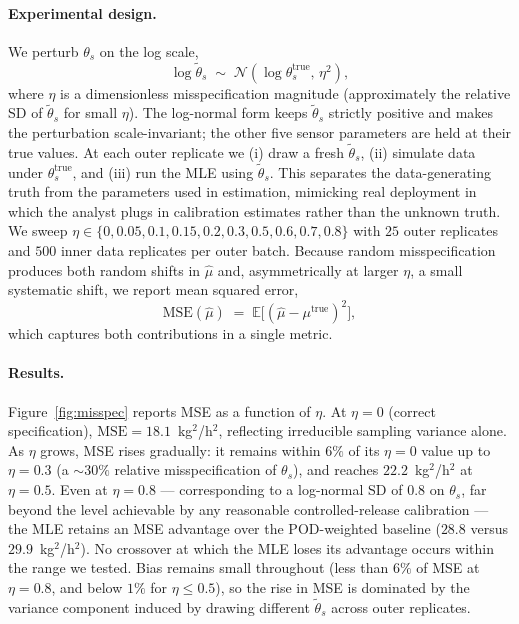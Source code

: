 \documentclass[11pt]{article}
\newcommand{\new}[1]{{\color{blue}#1}}
\begin{document}
\paragraph{Experimental design.}
\new{We perturb $\theta_s$ on the log scale,
\begin{equation}
    \log \tilde\theta_s \;\sim\; \mathcal{N}(\log \theta_s^{\text{true}},\, \eta^2),
\end{equation}
where $\eta$ is a dimensionless misspecification magnitude
(approximately the relative SD of $\tilde\theta_s$ for small $\eta$). The
log-normal form keeps $\tilde\theta_s$ strictly positive and makes the
perturbation scale-invariant; the other five sensor parameters are held
at their true values. At each outer replicate we (i) draw a fresh
$\tilde\theta_s$, (ii) simulate data under $\theta_s^{\text{true}}$, and
(iii) run the MLE using $\tilde\theta_s$. This separates the data-generating
truth from the parameters used in estimation, mimicking real deployment in
which the analyst plugs in calibration estimates rather than the unknown
truth. We sweep $\eta \in \{0, 0.05, 0.1, 0.15, 0.2, 0.3, 0.5, 0.6, 0.7, 0.8\}$
with $25$ outer replicates and $500$ inner data replicates per outer
batch. Because random misspecification produces both random shifts in
$\hat\mu$ and, asymmetrically at larger $\eta$, a small systematic shift,
we report mean squared error,
\begin{equation}
    \mathrm{MSE}(\hat\mu) \;=\; \mathbb{E}\!\bigl[(\hat\mu - \mu^{\text{true}})^2\bigr],
\end{equation}
which captures both contributions in a single metric.}

\paragraph{Results.}
\new{Figure~\ref{fig:misspec} reports MSE as a function of $\eta$. At
$\eta = 0$ (correct specification), $\mathrm{MSE} = 18.1$~kg$^2$/h$^2$,
reflecting irreducible sampling variance alone. As $\eta$ grows, MSE
rises gradually: it remains within $6\%$ of its $\eta=0$ value up to
$\eta = 0.3$ (a $\sim\!30\%$ relative misspecification of $\theta_s$),
and reaches $22.2$~kg$^2$/h$^2$ at $\eta = 0.5$. Even at $\eta = 0.8$ —
corresponding to a log-normal SD of $0.8$ on $\theta_s$, far beyond the
level achievable by any reasonable controlled-release calibration — the
MLE retains an MSE advantage over the POD-weighted baseline
($28.8$ versus $29.9$~kg$^2$/h$^2$). No crossover at which the MLE loses
its advantage occurs within the range we tested. Bias remains small
throughout (less than $6\%$ of MSE at $\eta = 0.8$, and below $1\%$ for
$\eta \le 0.5$), so the rise in MSE is dominated by the variance
component induced by drawing different $\tilde\theta_s$ across outer
replicates.}
\end{document}
